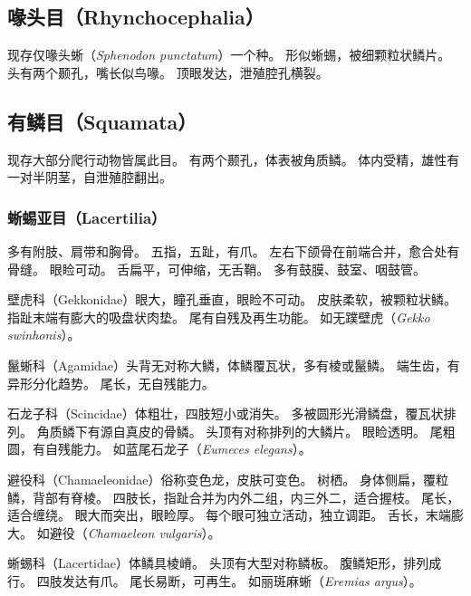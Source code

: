 \documentclass[11pt]{article}
\begin{document}
\subsection{喙头目（Rhynchocephalia）}
现存仅喙头蜥（\textit{Sphenodon punctatum}）一个种。
形似蜥蜴，被细颗粒状鳞片。
头有两个颞孔，嘴长似鸟喙。
顶眼发达，泄殖腔孔横裂。

\subsection{有鳞目（Squamata）}
现存大部分爬行动物皆属此目。
有两个颞孔，体表被角质鳞。
体内受精，雄性有一对半阴茎，自泄殖腔翻出。

\subsubsection{蜥蜴亚目（Lacertilia）}
多有附肢、肩带和胸骨。
五指，五趾，有爪。
左右下颌骨在前端合并，愈合处有骨缝。
眼睑可动。
舌扁平，可伸缩，无舌鞘。
多有鼓膜、鼓室、咽鼓管。

\newline

壁虎科（Gekkonidae）眼大，瞳孔垂直，眼睑不可动。
皮肤柔软，被颗粒状鳞。
指趾末端有膨大的吸盘状肉垫。
尾有自残及再生功能。
如无蹼壁虎（\textit{Gekko swinhonis}）。

\newline

鬣蜥科（Agamidae）头背无对称大鳞，体鳞覆瓦状，多有棱或鬣鳞。
端生齿，有异形分化趋势。
尾长，无自残能力。

\newline

石龙子科（Scincidae）体粗壮，四肢短小或消失。
多被圆形光滑鳞盘，覆瓦状排列。
角质鳞下有源自真皮的骨鳞。
头顶有对称排列的大鳞片。
眼睑透明。
尾粗圆，有自残能力。
如蓝尾石龙子（\textit{Eumeces elegans}）。

\newline

避役科（Chamaeleonidae）俗称变色龙，皮肤可变色。
树栖。
身体侧扁，覆粒鳞，背部有脊棱。
四肢长，指趾合并为内外二组，内三外二，适合握枝。
尾长，适合缠绕。
眼大而突出，眼睑厚。
每个眼可独立活动，独立调距。
舌长，末端膨大。
如避役（\textit{Chamaeleon vulgaris}）。

\newline

蜥蜴科（Lacertidae）体鳞具棱嵴。
头顶有大型对称鳞板。
腹鳞矩形，排列成行。
四肢发达有爪。
尾长易断，可再生。
如丽斑麻蜥（\textit{Eremias argus}）。
\end{document}
